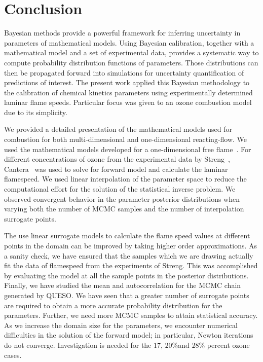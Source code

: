 
\chapter{Conclusion}\label{chap:conclusion}

Bayesian methods provide a powerful framework for inferring
uncertainty in parameters of mathematical models. Using Bayesian
calibration, together with a mathematical model and
a set of experimental data, provides a systematic way to compute
probability distribution functions of parameters.
Those
distributions can then be propagated forward into simulations for
uncertainty quantification of predictions of interest. The present
work applied this Bayesian methodology to the calibration of chemical
kinetics parameters using experimentally determined
laminar flame speeds.
Particular focus was given to an ozone combustion model due to its simplicity.


We provided a detailed presentation of the mathematical models used for
combustion for both multi-dimensional and one-dimensional
reacting-flow. We used the mathematical models developed
for a one-dimensional free flame~\cite{Kuo}.
For different concentrations of ozone
from the experimental data by Streng~\cite{Streng},
Cantera~\cite{Cantera} was used to solve for forward model and
calculate the laminar flamespeed. We used linear interpolation of the
parameter space to reduce the computational effort for the solution of
the statistical inverse problem. We observed convergent behavior in
the parameter posterior distributions when varying both the number of
MCMC samples and the number of interpolation surrogate points.

The use linear surrogate models to calculate the flame
speed values at different points in the domain can be improved by
taking higher order approximations. As a sanity check, we have ensured
that the samples which we are drawing actually fit the data of
flamespeed from the experiments of Streng\cite{Streng}. This was
accomplished by evaluating the model at all the sample points in the
posterior distributions. Finally, we
have studied the mean and autocorrelation  for the
MCMC chain generated by QUESO.
We have seen that a greater number of surrogate points are
required to obtain a more accurate probability distribution for the
parameters. Further, we need more MCMC samples to attain statistical
accuracy. As we increase the domain size for the parameters, we
encounter numerical difficulties in the solution of the forward model;
in particular, Newton
iterations do not converge. Investigation is needed for the $17$,
$20 \% $and $ 28 \% $ percent ozone cases.

